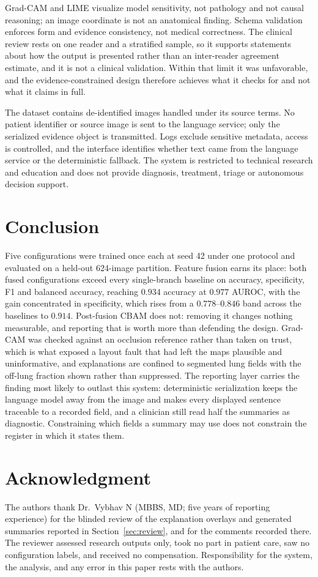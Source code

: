 \documentclass[conference]{IEEEtran}
\begin{document}
Grad-CAM and LIME visualize model sensitivity, not pathology and not causal
reasoning; an image coordinate is not an anatomical finding. Schema
validation enforces form and evidence consistency, not medical correctness.
The clinical review rests on one reader and a stratified sample, so it
supports statements about how the output is presented rather than an
inter-reader agreement estimate, and it is not a clinical validation. Within
that limit it was unfavorable, and the evidence-constrained design therefore
achieves what it checks for and not what it claims in full.

The dataset contains de-identified images handled under its source terms. No
patient identifier or source image is sent to the language service; only the
serialized evidence object is transmitted. Logs exclude sensitive metadata,
access is controlled, and the interface identifies whether text came from the
language service or the deterministic fallback. The system is restricted to
technical research and education and does not provide diagnosis, treatment,
triage or autonomous decision support.

\section{Conclusion}
Five configurations were trained once each at seed 42 under one protocol and
evaluated on a held-out 624-image partition. Feature fusion earns its place:
both fused configurations exceed every single-branch baseline on accuracy,
specificity, F1 and balanced accuracy, reaching $0.934$ accuracy at $0.977$
AUROC, with the gain concentrated in specificity, which rises from a
$0.778$--$0.846$ band across the baselines to $0.914$. Post-fusion CBAM does
not: removing it changes nothing measurable, and reporting that is worth
more than defending the design. Grad-CAM was checked against an occlusion
reference rather than taken on trust, which is what exposed a layout fault
that had left the maps plausible and uninformative, and explanations are
confined to segmented lung fields with the off-lung fraction shown rather
than suppressed. The reporting layer carries the finding most likely to
outlast this system: deterministic serialization keeps the language model
away from the image and makes every displayed sentence traceable to a
recorded field, and a clinician still read half the summaries as diagnostic.
Constraining which fields a summary may use does not constrain the register
in which it states them.

\section*{Acknowledgment}
The authors thank Dr.\ Vybhav N (MBBS, MD; five years of reporting experience) for the blinded review of the
explanation overlays and generated summaries reported in
Section~\ref{sec:review}, and for the comments recorded there. The reviewer assessed research outputs only, took no part in patient care,
saw no configuration labels, and received no compensation. Responsibility for the system, the analysis, and
any error in this paper rests with the authors.



\end{document}

